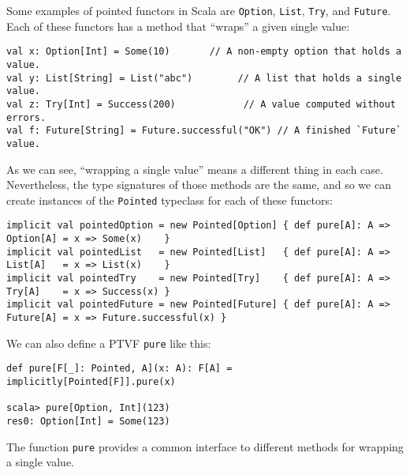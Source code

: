 Some examples of pointed functors in Scala are \lstinline!Option!,
\lstinline!List!, \lstinline!Try!, and \lstinline!Future!. Each
of these functors has a method that \textsf{``}wraps\textsf{''} a given single value:
\begin{lstlisting}
val x: Option[Int] = Some(10)       // A non-empty option that holds a value.
val y: List[String] = List("abc")        // A list that holds a single value.
val z: Try[Int] = Success(200)            // A value computed without errors.
val f: Future[String] = Future.successful("OK") // A finished `Future` value.
\end{lstlisting}
As we can see, \textsf{``}wrapping a single value\textsf{''} means a different thing
in each case. Nevertheless, the type signatures of those methods are
the same, and so we can create instances of the \lstinline!Pointed!
typeclass for each of these functors:
\begin{lstlisting}
implicit val pointedOption = new Pointed[Option] { def pure[A]: A => Option[A] = x => Some(x)    }
implicit val pointedList   = new Pointed[List]   { def pure[A]: A => List[A]   = x => List(x)    }
implicit val pointedTry    = new Pointed[Try]    { def pure[A]: A => Try[A]    = x => Success(x) }
implicit val pointedFuture = new Pointed[Future] { def pure[A]: A => Future[A] = x => Future.successful(x) }
\end{lstlisting}
We can also define a PTVF \lstinline!pure! like this:
\begin{lstlisting}
def pure[F[_]: Pointed, A](x: A): F[A] = implicitly[Pointed[F]].pure(x)

scala> pure[Option, Int](123)
res0: Option[Int] = Some(123)
\end{lstlisting}
The function \lstinline!pure! provides a common interface to different
methods for wrapping a single value.

